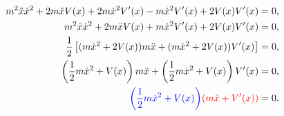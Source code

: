 \begin{problema}
    \kant[1]
\end{problema}
\solution

\kant[1-3]

\begin{align*}
    m^{2}\ddot{x}\dot{x}^{2} + 2m\ddot{x}V(x) + 2m\dot{x}^{2}V^{\prime}(x) - m\dot{x}^{2}V^{\prime}(x) + 2V(x)V^{\prime}(x) &= 0,\\
    m^{2}\ddot{x}\dot{x}^{2} + 2m\ddot{x}V(x) + m\dot{x}^{2}V^{\prime}(x) + 2V(x)V^{\prime}(x) &= 0,\\
    \dfrac{1}{2}\left[(m\dot{x}^{2} + 2V(x))m\ddot{x} + (m\dot{x}^{2} + 2V(x))V^{\prime}(x)\right] &= 0,\\
    \left(\dfrac{1}{2}m\dot{x}^{2} + V(x)\right)m\ddot{x} + \left(\dfrac{1}{2}m\dot{x}^{2} + V(x)\right)V^{\prime}(x) &= 0,\\
    \textcolor{blue}{\left(\dfrac{1}{2}m\dot{x}^{2} + V(x)\right)}\textcolor{red}{(m\ddot{x} + V^{\prime}(x))} &= 0.
\end{align*}